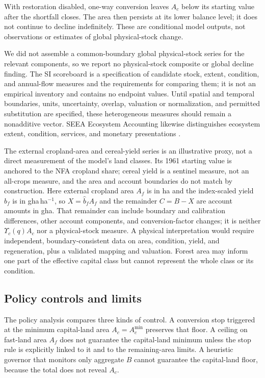 \documentclass[preprint,12pt,authoryear]{elsarticle}
\newcommand{\Ups}{\Upsilon_c}
\newcommand{\Acmin}{A_c^{\min}}
\begin{document}
With restoration disabled, one-way conversion leaves $A_c$ below its starting value after the shortfall closes. The area then persists at its lower balance level; it does not continue to decline indefinitely. These are conditional model outputs, not observations or estimates of global physical-stock change.

We did not assemble a common-boundary global physical-stock series for the relevant components, so we report no physical-stock composite or global decline finding. The SI scoreboard is a specification of candidate stock, extent, condition, and annual-flow measures and the requirements for comparing them; it is not an empirical inventory and contains no endpoint values. Until spatial and temporal boundaries, units, uncertainty, overlap, valuation or normalization, and permitted substitution are specified, these heterogeneous measures should remain a nonadditive vector. SEEA Ecosystem Accounting likewise distinguishes ecosystem extent, condition, services, and monetary presentations \citep{UN2021SEEA_EA}.

The external cropland-area and cereal-yield series is an illustrative proxy, not a direct measurement of the model's land classes. Its 1961 starting value is anchored to the NFA cropland share; cereal yield is a sentinel measure, not an all-crops measure, and the area and account boundaries do not match by construction. Here external cropland area $A_f$ is in ha and the index-scaled yield $\hat b_f$ is in gha\,ha$^{-1}$, so $X=\hat b_fA_f$ and the remainder $C=B-X$ are account amounts in gha. That remainder can include boundary and calibration differences, other account components, and conversion-factor changes; it is neither $\Ups(q)A_c$ nor a physical-stock measure. A physical interpretation would require independent, boundary-consistent data on area, condition, yield, and regeneration, plus a validated mapping and valuation. Forest area may inform one part of the effective capital class but cannot represent the whole class or its condition.

\subsection{Policy controls and limits}

The policy analysis compares three kinds of control. A conversion stop triggered at the minimum capital-land area $A_c=\Acmin$ preserves that floor. A ceiling on fast-land area $A_f$ does not guarantee the capital-land minimum unless the stop rule is explicitly linked to it and to the remaining-area limits. A heuristic governor that monitors only aggregate $B$ cannot guarantee the capital-land floor, because the total does not reveal $A_c$.
\end{document}
